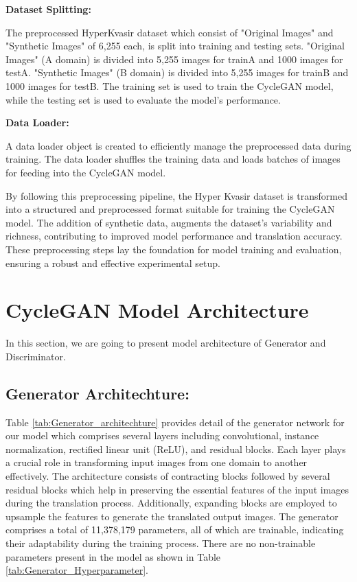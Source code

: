 \documentclass[UKenglish,12pt]{master-style}
\begin{document}
\textbf{{Dataset Splitting:}}

The preprocessed HyperKvasir dataset which consist of "Original
Images" and "Synthetic Images" of 6,255 each, is split into training and testing sets. "Original Images" (A domain) is divided into 5,255 images for trainA and 1000 images for testA. "Synthetic Images" (B domain) is divided into 5,255 images for trainB and 1000 images for testB. The training set is used to train the CycleGAN model, while the testing set is used to evaluate the model's performance. 

\textbf{{Data Loader:}}

A data loader object is created to efficiently manage the preprocessed data during training. The data loader shuffles the training data and loads batches of images for feeding into the CycleGAN model.

By following this preprocessing pipeline, the Hyper Kvasir dataset is transformed into a structured and preprocessed format suitable for training the CycleGAN model. The addition of synthetic data, augments the dataset's variability and richness, contributing to improved model performance and translation accuracy. These preprocessing steps lay the foundation for model training and evaluation, ensuring a robust and effective experimental setup.

\section{CycleGAN Model Architecture}

In this section, we are going to present model architecture of Generator and Discriminator.

\subsection{Generator Architechture:} Table \ref{tab:Generator_architechture} provides detail of the generator network for our model which comprises several layers including convolutional, instance normalization, rectified linear unit (ReLU), and residual blocks. Each layer plays a crucial role in transforming input images from one domain to another effectively. The architecture consists of contracting blocks followed by several residual blocks which help in preserving the essential features of the input images during the translation process. Additionally, expanding blocks are employed to upsample the features to generate the translated output images. The generator comprises a total of 11,378,179 parameters, all of which are trainable, indicating their adaptability during the training process. There are no non-trainable parameters present in the model as shown in Table \ref{tab:Generator_Hyperparameter}. 
\end{document}
